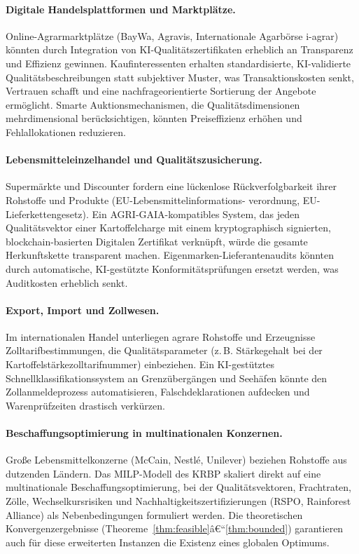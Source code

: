 \documentclass[a4paper, 12pt, twoside, openright]{report}
\theoremstyle{definition}
\theoremstyle{definition}
\begin{document}
\paragraph{Digitale Handelsplattformen und Marktplätze.}
Online-Agrarmarktplätze (BayWa, Agravis, Internationale Agarbörse
i-agrar) könnten durch Integration von KI-Qualitätszertifi\-katen
erheblich an Transparenz und Effizienz gewinnen. Kaufinteressenten
erhalten standardisierte, KI-validierte Qualitätsbeschreibungen
statt subjektiver Muster, was Transaktionskosten senkt,
Vertrauen schafft und eine nachfrageorientierte Sortierung
der Angebote ermöglicht. Smarte Auktionsmechanismen, die
Qualitätsdimensionen mehrdimensional berücksichtigen, könnten
Preiseffizienz erhöhen und Fehlallokationen reduzieren.

\paragraph{Lebensmitteleinzelhandel und Qualitätszusicherung.}
Supermärkte und Discounter fordern eine lückenlose
Rückverfolgbarkeit ihrer Rohstoffe und Produkte (EU-Lebensmittel\-informations-
verordnung, EU-Lieferkettengesetz). Ein AGRI-GAIA-kompatibles System,
das jeden Qualitäts\-vektor einer Kartoffelcharge mit einem
kryptographisch signierten, blockchain-basierten Digitalen Zertifikat
verknüpft, würde die gesamte Herkunftskette transparent machen.
Eigenmarken-Lieferantenaudits könnten durch automatische, KI-gestützte
Konformitätsprüfungen ersetzt werden, was Auditkosten erheblich senkt.

\paragraph{Export, Import und Zollwesen.}
Im internationalen Handel unterliegen agrare Rohstoffe und Erzeugnisse
Zolltarifbestimmungen, die Qualitätsparameter (z.\,B. Stärkegehalt
bei der Kartoffelstärkezolltarifnummer) einbeziehen. Ein KI-gestütztes
Schnellklassifikationssystem an Grenzübergängen und Seehäfen könnte
den Zollanmeldeprozess automatisieren, Falschdeklarationen aufdecken
und Warenprüfzeiten drastisch verkürzen.

\paragraph{Beschaffungsoptimierung in multinationalen Konzernen.}
Große Lebensmittelkonzerne (McCain, Nestlé, Unilever) beziehen
Rohstoffe aus dutzenden Ländern. Das MILP-Modell des KRBP skaliert
direkt auf eine multinationale Beschaffungsoptimierung, bei der
Qualitätsvektoren, Frachtraten, Zölle, Wechselkursrisiken und
Nachhaltigkeitszertifizierungen (RSPO, Rainforest Alliance) als
Nebenbedingungen formuliert werden. Die theoretischen Konvergenzergebnisse
(Theoreme~\ref{thm:feasible}â€“\ref{thm:bounded}) garantieren auch
für diese erweiterten Instanzen die Existenz eines globalen Optimums.
\end{document}
